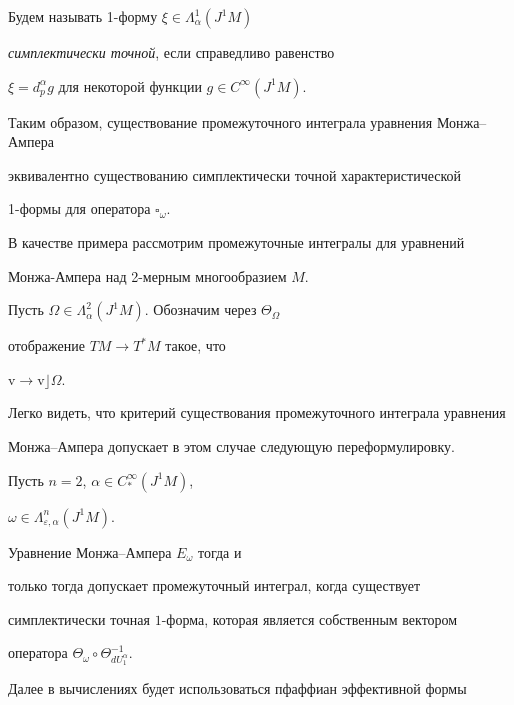 Будем называть 1-форму $\xi \in \Lambda_\alpha^1(J^1M)$ 


{\em симплектически точной}, если справедливо равенство 


$\xi=d_p^\alpha g$ для некоторой функции $g\in C^\infty (J^1M)$. 





Таким образом, существование промежуточного интеграла уравнения Монжа--Ампера


эквивалентно существованию симплектически точной характеристической


1-формы для оператора $\square_\omega$.





В качестве примера рассмотрим промежуточные интегралы для уравнений 


Монжа-Ампера над 2-мерным многообразием $M$.


Пусть $\Omega \in \Lambda_\alpha^2(J^1M)$. Обозначим через $\Theta_\Omega$


отображение $TM\to T^{*}M$ такое, что 


$\mathrm v\to \mathrm v \rfloor \Omega$.





Легко видеть, что критерий существования промежуточного интеграла уравнения 


Монжа--Ампера допускает в этом случае следующую переформулировку.





\begin{prop} \label{integral7}


Пусть $n=2$, $\alpha \in C_{*}^\infty (J^1M)$,


$\omega \in \Lambda_{\varepsilon ,\alpha }^n(J^1M)$.


Уравнение Монжа--Ампера $E_\omega $ тогда и


только тогда допускает промежуточный интеграл, когда существует 


симплектически точная $1$-форма, которая является собственным вектором


оператора $\Theta_\omega \circ \Theta_{dU_1^\alpha }^{-1}$.


\end{prop}





Далее в вычислениях будет использоваться пфаффиан эффективной формы


